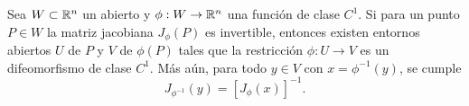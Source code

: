 \begin{theorem}
  Sea \( W\subset\mathbb{R}^n \) un abierto y \( \phi: W\to \mathbb{R}^n \) una función de clase \( C^1 \). Si para un punto \( P\in W  \) la matriz jacobiana \( J_{\phi}(P) \) es invertible, entonces existen entornos abiertos \( U \) de \( P \) y \( V \) de \( \phi(P) \) tales que la restricción \( \phi: U\to V \) es un difeomorfismo de clase \( C^1 \). Más aún, para todo \( y\in V \) con \( x = \phi^{-1}(y) \), se cumple
  \[
    J_{\phi^{-1}}(y) = [J_{\phi}(x)]^{-1}.
  \]
\end{theorem}